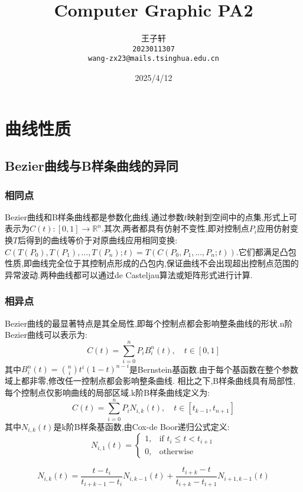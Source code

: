 \documentclass[a4paper,twoside]{article}
\title{Computer Graphic PA2}
\author{
  王子轩\\
  \texttt{2023011307} \\
  \texttt{wang-zx23@mails.tsinghua.edu.cn} \\
}
\date{2025/4/12}
\begin{document}
\maketitle

\section{曲线性质}
\subsection{Bezier曲线与B样条曲线的异同}
\subsubsection{相同点}
Bezier曲线和B样条曲线都是参数化曲线,通过参数$t$映射到空间中的点集,形式上可表示为$C(t): [0,1] \rightarrow \mathbb{R}^n$.其次,两者都具有仿射不变性,即对控制点$P_i$应用仿射变换$T$后得到的曲线等价于对原曲线应用相同变换:$C(T(P_0), T(P_1), ..., T(P_n); t) = T(C(P_0, P_1, ..., P_n; t))$.它们都满足凸包性质,即曲线完全位于其控制点形成的凸包内,保证曲线不会出现超出控制点范围的异常波动.两种曲线都可以通过de Casteljau算法或矩阵形式进行计算.
\subsubsection{相异点}
Bezier曲线的最显著特点是其全局性,即每个控制点都会影响整条曲线的形状.n阶Bezier曲线可以表示为:
\begin{equation}
C(t) = \sum_{i=0}^{n} P_i B_i^n(t), \quad t \in [0,1]
\end{equation}
其中$B_i^n(t) = \binom{n}{i} t^i (1-t)^{n-i}$是Bernstein基函数.由于每个基函数在整个参数域上都非零,修改任一控制点都会影响整条曲线.
相比之下,B样条曲线具有局部性,每个控制点仅影响曲线的局部区域.k阶B样条曲线定义为:
\begin{equation}
C(t) = \sum_{i=0}^{n} P_i N_{i,k}(t), \quad t \in [t_{k-1}, t_{n+1}]
\end{equation}
其中$N_{i,k}(t)$是k阶B样条基函数,由Cox-de Boor递归公式定义:
\begin{equation}
N_{i,1}(t) = 
\begin{cases}
1, & \text{if } t_i \leq t < t_{i+1} \\
0, & \text{otherwise}
\end{cases}
\end{equation}

\begin{equation}
N_{i,k}(t) = \frac{t - t_i}{t_{i+k-1} - t_i} N_{i,k-1}(t) + \frac{t_{i+k} - t}{t_{i+k} - t_{i+1}} N_{i+1,k-1}(t)
\end{equation}
\end{document}
